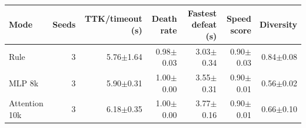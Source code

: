 \begin{tabular}{lrrrrrr}
\toprule
Mode & Seeds & TTK/timeout (s) & Death rate & Fastest defeat (s) & Speed score & Diversity \\
\midrule
Rule & 3 & 5.76$\pm$1.64 & 0.98$\pm$0.03 & 3.03$\pm$0.34 & 0.90$\pm$0.03 & 0.84$\pm$0.08 \\
MLP 8k & 3 & 5.90$\pm$0.31 & 1.00$\pm$0.00 & 3.55$\pm$0.31 & 0.90$\pm$0.01 & 0.56$\pm$0.02 \\
Attention 10k & 3 & 6.18$\pm$0.35 & 1.00$\pm$0.00 & 3.77$\pm$0.16 & 0.90$\pm$0.01 & 0.66$\pm$0.10 \\
\bottomrule
\end{tabular}
